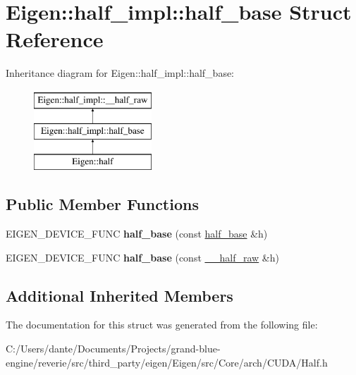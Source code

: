 \hypertarget{struct_eigen_1_1half__impl_1_1half__base}{}\section{Eigen\+::half\+\_\+impl\+::half\+\_\+base Struct Reference}
\label{struct_eigen_1_1half__impl_1_1half__base}
Inheritance diagram for Eigen\+::half\+\_\+impl\+::half\+\_\+base\+:\begin{figure}[H]
\begin{center}
\leavevmode
\includegraphics[height=3.000000cm]{struct_eigen_1_1half__impl_1_1half__base}
\end{center}
\end{figure}
\subsection*{Public Member Functions}
\begin{DoxyCompactItemize}
\item 
\mbox{\label{struct_eigen_1_1half__impl_1_1half__base_ab00b716edd079f9d19b38e97a7254db6}} 
E\+I\+G\+E\+N\+\_\+\+D\+E\+V\+I\+C\+E\+\_\+\+F\+U\+NC {\bfseries half\+\_\+base} (const \mbox{\hyperlink{struct_eigen_1_1half__impl_1_1half__base}{half\+\_\+base}} \&h)
\item 
\mbox{\label{struct_eigen_1_1half__impl_1_1half__base_a5037adae6af26b9e355b1ecaca38c10d}} 
E\+I\+G\+E\+N\+\_\+\+D\+E\+V\+I\+C\+E\+\_\+\+F\+U\+NC {\bfseries half\+\_\+base} (const \mbox{\hyperlink{struct_eigen_1_1half__impl_1_1____half__raw}{\+\_\+\+\_\+half\+\_\+raw}} \&h)
\end{DoxyCompactItemize}
\subsection*{Additional Inherited Members}


The documentation for this struct was generated from the following file\+:\begin{DoxyCompactItemize}
\item 
C\+:/\+Users/dante/\+Documents/\+Projects/grand-\/blue-\/engine/reverie/src/third\+\_\+party/eigen/\+Eigen/src/\+Core/arch/\+C\+U\+D\+A/Half.\+h\end{DoxyCompactItemize}
